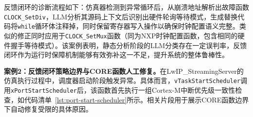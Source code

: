 反馈闭环的诊断流程如下：仿真器检测到异常循环后，从崩溃地址解析出故障函数\texttt{CLOCK\_SetDiv}，LLM分析其源码上下文后识别出硬件轮询等待模式，生成替换代码将\texttt{while}循环体注释掉，同时保留寄存器写入操作以确保时钟配置语义完整。类似的修正同时应用于\texttt{CLOCK\_SetMux}函数（同为NXP时钟配置函数，包含相同的硬件握手等待模式）。该案例表明，静态分析阶段的LLM分类存在一定误判率，反馈闭环作为运行时保障机制能够有效弥补这一不足，提升系统的整体鲁棒性。

% 
% 
% 
% 
% 
% 
\textbf{案例2：反馈闭环策略边界与CORE函数人工修复。}在LwIP\_StreamingServer的仿真执行过程中，调度器启动阶段触发异常。具体而言，\texttt{vTaskStartScheduler}调用\texttt{xPortStartScheduler}后，该函数首先执行一组Cortex-M中断优先级一致性检查，如代码清单~\ref{lst:port-start-scheduler}所示。相关片段用于展示CORE函数边界下自动修复受限的具体原因。


